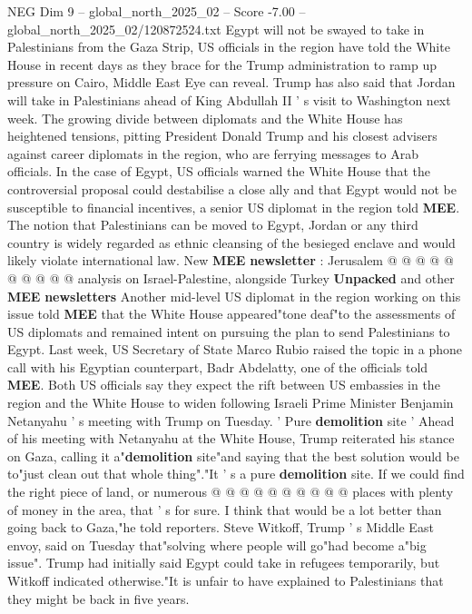 \begin{textsample}{NEG Dim 9 – global\_north\_2025\_02 – Score -7.00 – global\_north\_2025\_02/120872524.txt}  \label{ex:f9_neg_006}
Egypt will not be swayed to take in Palestinians from the Gaza Strip, US officials in the region have told the White House in recent days as they brace for the Trump administration to ramp up pressure on Cairo, Middle East Eye can reveal.
Trump has also said that Jordan will take in Palestinians ahead of King Abdullah II ' s visit to Washington next week.
The growing divide between diplomats and the White House has heightened tensions, pitting President Donald Trump and his closest advisers against career diplomats in the region, who are ferrying messages to Arab officials.
In the case of Egypt, US officials warned the White House that the controversial proposal could destabilise a close ally and that Egypt would not be susceptible to financial incentives, a senior US diplomat in the region told \textbf{MEE}.
The notion that Palestinians can be moved to Egypt, Jordan or any third country is widely regarded as ethnic cleansing of the besieged enclave and would likely violate international law.
New \textbf{MEE} \textbf{newsletter} : Jerusalem @ @ @ @ @ @ @ @ @ @ analysis on Israel-Palestine, alongside Turkey \textbf{Unpacked} and other \textbf{MEE} \textbf{newsletters} Another mid-level US diplomat in the region working on this issue told \textbf{MEE} that the White House appeared"tone deaf"to the assessments of US diplomats and remained intent on pursuing the plan to send Palestinians to Egypt.
Last week, US Secretary of State Marco Rubio raised the topic in a phone call with his Egyptian counterpart, Badr Abdelatty, one of the officials told \textbf{MEE}.
Both US officials say they expect the rift between US embassies in the region and the White House to widen following Israeli Prime Minister Benjamin Netanyahu ' s meeting with Trump on Tuesday. ' Pure \textbf{demolition} site ' Ahead of his meeting with Netanyahu at the White House, Trump reiterated his stance on Gaza, calling it a"\textbf{demolition} site"and saying that the best solution would be to"just clean out that whole thing"."It ' s a pure \textbf{demolition} site.
If we could find the right piece of land, or numerous @ @ @ @ @ @ @ @ @ @ places with plenty of money in the area, that ' s for sure.
I think that would be a lot better than going back to Gaza,"he told reporters.
Steve Witkoff, Trump ' s Middle East envoy, said on Tuesday that"solving where people will go"had become a"big issue".
Trump had initially said Egypt could take in refugees temporarily, but Witkoff indicated otherwise."It is unfair to have explained to Palestinians that they might be back in five years.

\end{textsample}
